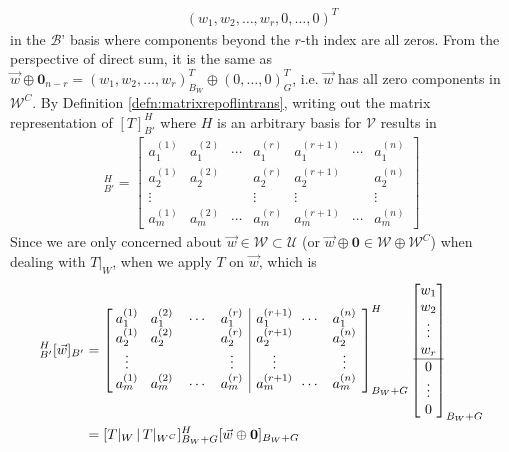 \begin{align*}
(w_1, w_2, \ldots, w_r, 0, \ldots, 0)^T
\end{align*}
in the $\mathcal{B}$' basis where components beyond the $r$-th index are all zeros. From the perspective of direct sum, it is the same as $\vec{w} \oplus \textbf{0}_{n-r} = (w_1, w_2, \ldots, w_r)_{B_W}^T \oplus (0, \ldots, 0)_{G}^T$, i.e. $\vec{w}$ has all zero components in $\mathcal{W}^C$. By Definition \ref{defn:matrixrepoflintrans}, writing out the matrix representation of $[T]_{B'}^H$ where $H$ is an arbitrary basis for $\mathcal{V}$ results in
\begin{align*}
[T]_{B'}^H = \begin{bmatrix}
a_1^{(1)} & a_1^{(2)} & \cdots & a_1^{(r)} & a_1^{(r+1)} & \cdots & a_1^{(n)} \\
a_2^{(1)} & a_2^{(2)} & & a_2^{(r)} & a_2^{(r+1)} & & a_2^{(n)} \\
\vdots & & & \vdots & \vdots & & \vdots \\
a_m^{(1)} & a_m^{(2)} & \cdots & a_m^{(r)} & a_m^{(r+1)} & \cdots & a_m^{(n)}
\end{bmatrix}
\end{align*}
Since we are only concerned about $\vec{w} \in \mathcal{W} \subset \mathcal{U}$ (or $\vec{w} \oplus \textbf{0} \in \mathcal{W} \oplus \mathcal{W}^C$) when dealing with $T|_W$, when we apply $T$ on $\vec{w}$, which is
\begin{align*}
[T]_{B'}^H[\vec{w}]_{B'}
&=
\left[\begin{array}{@{\;}wc{15pt}wc{15pt}wc{15pt}wc{15pt}|@{\quad}wc{15pt}wc{15pt}wc{15pt}}
a_1^{(1)} & a_1^{(2)} & \cdots & a_1^{(r)} & a_1^{(r+1)} & \cdots & a_1^{(n)} \\
a_2^{(1)} & a_2^{(2)} & & a_2^{(r)} & a_2^{(r+1)} & & a_2^{(n)} \\
\vdots & & & \vdots & \vdots & & \vdots \\
a_m^{(1)} & a_m^{(2)} & \cdots & a_m^{(r)} & a_m^{(r+1)} & \cdots & a_m^{(n)}
\end{array}\right]_{B_W+G}^H
\begin{bmatrix}
w_1 \\
w_2 \\
\vdots \\
w_r \\
\hline
0 \\
\vdots \\
0
\end{bmatrix}_{B_W+G} \\
&= [T|_W\,|\,T|_{W^C}]_{B_W+G}^H[\vec{w} \oplus \textbf{0}]_{B_W+G} \\
\end{align*}
